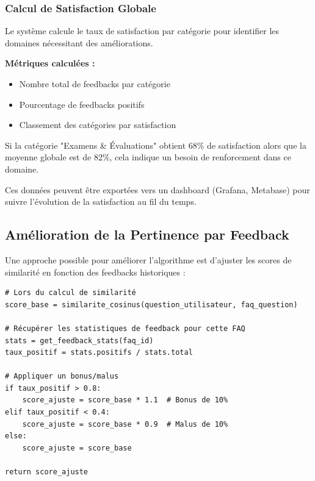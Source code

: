 \documentclass[11pt,a4paper]{article}
\begin{document}
\subsubsection{Calcul de Satisfaction Globale}

Le système calcule le taux de satisfaction par catégorie pour identifier les domaines nécessitant des améliorations.

\textbf{Métriques calculées :}
\begin{itemize}
    \item Nombre total de feedbacks par catégorie
    \item Pourcentage de feedbacks positifs
    \item Classement des catégories par satisfaction
\end{itemize}

\begin{exemple}[Interprétation]
Si la catégorie "Examens \& Évaluations" obtient 68\% de satisfaction alors que la moyenne globale est de 82\%, cela indique un besoin de renforcement dans ce domaine.
\end{exemple}

\begin{astuce}[Visualisation]
Ces données peuvent être exportées vers un dashboard (Grafana, Metabase) pour suivre l'évolution de la satisfaction au fil du temps.
\end{astuce}

\clearpage

\subsection{Amélioration de la Pertinence par Feedback}

Une approche possible pour améliorer l'algorithme est d'ajuster les scores de similarité en fonction des feedbacks historiques :

\begin{exemple}
\begin{lstlisting}
# Lors du calcul de similarité
score_base = similarite_cosinus(question_utilisateur, faq_question)

# Récupérer les statistiques de feedback pour cette FAQ
stats = get_feedback_stats(faq_id)
taux_positif = stats.positifs / stats.total

# Appliquer un bonus/malus
if taux_positif > 0.8:
    score_ajuste = score_base * 1.1  # Bonus de 10%
elif taux_positif < 0.4:
    score_ajuste = score_base * 0.9  # Malus de 10%
else:
    score_ajuste = score_base

return score_ajuste
\end{lstlisting}
\end{exemple}
\end{document}
